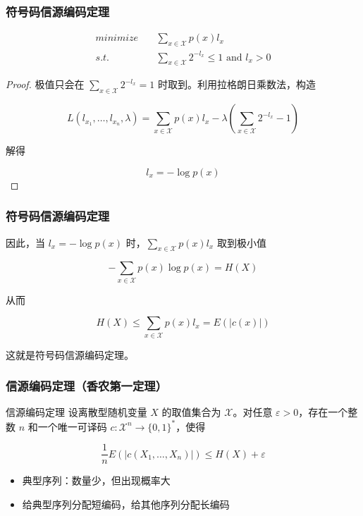 \documentclass{beamer}
\begin{document}
\begin{frame}
    \frametitle{符号码信源编码定理}

        \[\begin{split}
            minimize & \quad \sum_{x\in\mathcal{X}}p(x)l_x \\
            s.t. & \quad \sum_{x\in\mathcal{X}} 2^{-l_x} \leq 1 \text{ and } l_x > 0
        \end{split}\]

    \begin{proof}
        极值只会在 $\sum_{x\in\mathcal{X}} 2^{-l_x} = 1$ 时取到。利用拉格朗日乘数法，构造

        \[L(l_{x_1}, \dots, l_{x_n}, \lambda) = \sum_{x\in\mathcal{X}} p(x)l_x - \lambda\left(\sum_{x\in\mathcal{X}}2^{-l_x}-1\right)\]
        
        解得

        \[l_x = -\log p(x)\]

    \end{proof}

\end{frame}

\begin{frame}
    \frametitle{符号码信源编码定理}
    
    因此，当 $l_x = -\log p(x)$ 时，$\sum_{x\in\mathcal{X}}p(x)l_x$ 取到极小值

    \[-\sum_{x\in\mathcal{X}}p(x)\log p(x) = H(X)\]

    从而

    \[H(X) \leq \sum_{x\in\mathcal{X}}p(x)l_x = E(\lvert c(x)\rvert)\]

    这就是符号码信源编码定理。

\end{frame}

\begin{frame}
    \frametitle{信源编码定理（香农第一定理）}

    \begin{block}{信源编码定理}
        设离散型随机变量 $X$ 的取值集合为 $\mathcal{X}$。对任意 $\varepsilon > 0$，存在一个整数 $n$ 和一个唯一可译码 $c: \mathcal{X}^n \rightarrow \{0, 1\}^*$，使得

        \[\frac{1}{n}E(\lvert c(X_1, \dots, X_n)\rvert) \leq H(X) + \varepsilon\]
    \end{block}

    \begin{itemize}
        \item 典型序列：数量少，但出现概率大
        \item 给典型序列分配短编码，给其他序列分配长编码
    \end{itemize}

\end{frame}
\end{document}

